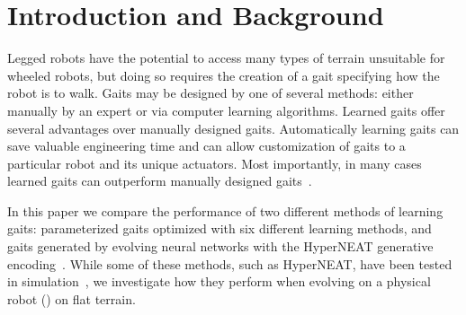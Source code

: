 \section{Introduction and Background}





Legged robots have the potential to access many types of terrain
unsuitable for wheeled robots, but doing so requires the creation of a
gait specifying how the robot is to walk.  Gaits may be designed
by one of several methods: either manually by an expert or
via computer learning algorithms.  Learned gaits
offer several advantages over manually designed gaits.  Automatically
learning gaits can save valuable engineering time and can allow
customization of gaits to a particular robot and its unique actuators.
Most importantly, in many cases learned gaits can outperform manually
designed gaits~\citep{hornby2005autonomous, valsalam2008modular}.

In this paper we compare the performance of two different methods of
learning gaits: parameterized gaits optimized with six different
learning methods, and gaits generated by evolving neural networks with
the HyperNEAT generative encoding~\citep{stanley2009hypercube}. While
some of these methods, such as HyperNEAT, have been tested in
simulation~\citep{clune2009evolving, clune2011performance}, we
investigate how they perform when evolving on a physical robot
() on flat terrain.

